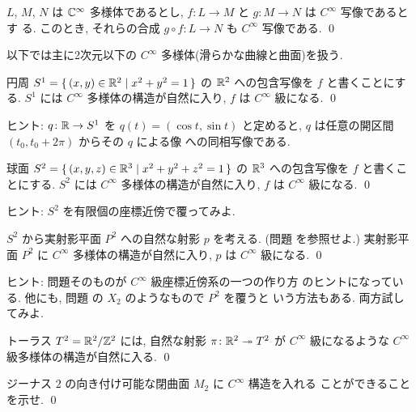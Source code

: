 \documentclass[12pt,twoside]{jarticle}
\def\Z{{\Bbb Z}} %
\def\R{{\Bbb R}} %
\def\C{{\Bbb C}} %
\def\onto{\twoheadrightarrow}
\begin{document}
\begin{question}
  $L$, $M$, $N$ は $\C^\infty$ 多様体であるとし, %
  $f\colon L \to M$ と $g \colon M \to N$ は $C^\infty$ 写像であるとす
  る. このとき, それらの合成 $g\circ f \colon L \to N$ も $C^\infty$ 
  写像である. \qed
\end{question}

以下では主に2次元以下の $C^\infty$ 多様体(滑らかな曲線と曲面)を扱う.

\begin{question}
  円周 $S^1 = \{\, (x,y)\in\R^2 \mid x^2 + y^2 = 1 \,\}$ の %
  $\R^2$ への包含写像を $f$ と書くことにする.  $S^1$ には $C^\infty$ %
  多様体の構造が自然に入り, $f$ は $C^\infty$ 級になる.
  \qed
\end{question}

\noindent ヒント: $q \colon \R \to S^1$ を $q(t) = (\cos t, \sin t)$ 
と定めると, $q$ は任意の開区間 $(t_0,t_0+2\pi)$ からその $q$ による像
への同相写像である.

\begin{question}
  球面 $S^2 = \{\, (x,y,z)\in\R^3 \mid x^2 + y^2 + z^2 = 1 \,\}$ の %
  $\R^3$ への包含写像を $f$ と書くことにする.  $S^2$ には $C^\infty$ %
  多様体の構造が自然に入り, $f$ は $C^\infty$ 級になる.
  \qed
\end{question}

\noindent ヒント: $S^2$ を有限個の座標近傍で覆ってみよ. 

\begin{question}
  $S^2$ から実射影平面 $P^2$ への自然な射影 $p$ を考える. %
  (問題  を参照せよ.) %
  実射影平面 $P^2$ に $C^\infty$ 多様体の構造が自然に入り, %
  $p$ は $C^\infty$ 級になる. 
  \qed
\end{question}

\noindent ヒント: 問題そのものが $C^\infty$ 級座標近傍系の一つの作り方
のヒントになっている. %
他にも, 問題  の $X_2$ のようなもので $P^2$ を覆うと
いう方法もある. 両方試してみよ.

\begin{question}
  トーラス $T^2 = \R^2/\Z^2$ には, %
  自然な射影 $\pi\colon\R^2\onto T^2$ が $C^\infty$ 級になるような %
  $C^\infty$ 級多様体の構造が自然に入る. 
  \qed
\end{question}

\begin{question}
  ジーナス $2$ の向き付け可能な閉曲面 $M_2$ に $C^\infty$ 構造を入れる
  ことができることを示せ. 
  \qed
\end{question}
\end{document}
